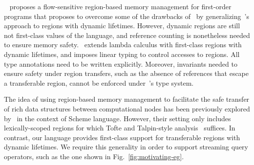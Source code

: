 ~\cite{HMN01} proposes a flow-sensitive region-based memory management
for first-order programs that proposes to overcome some of the
drawbacks of~\cite{tofte97} by generalizing~\cite{tofte97}'s approach
to regions with dynamic lifetimes. However, dynamic regions are still
not first-class values of the language, and reference counting is
nonetheless needed to ensure memory safety.~\cite{WW01} extends lambda
calculus with first-class regions with dynamic lifetimes, and imposes
linear typing to control accesses to regions. All type annotations
need to be written explicitly. Moreover, invariants needed to ensure
safety under region transfers, such as the absence of references that
escape a transferable region, cannot be enforced under~\cite{WW01}'s
type system.

The idea of using region-based memory management to facilitate the
safe transfer of rich data structures between computational nodes has
been previously explored by~\cite{gpu14} in the context of Scheme
language. However, their setting only includes lexically-scoped
regions for which Tofte and Talpin-style analysis~\cite{tofte97}
suffices. In contrast, our language provides first-class support for
transferable regions with dynamic lifetimes. We require this
generality in order to support streaming query operators, such as the
one shown in Fig.~\ref{fig:motivating-eg}. 

